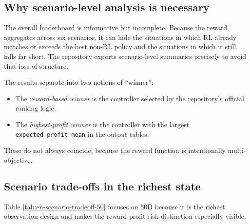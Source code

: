 \documentclass[12pt,a4paper]{article}
\begin{document}
\subsection{Why scenario-level analysis is necessary}

The overall leaderboard is informative but incomplete. Because the reward aggregates across six scenarios, it can hide the situations in which RL already matches or exceeds the best non-RL policy and the situations in which it still falls far short. The repository exports scenario-level summaries precisely to avoid that loss of structure.

The results separate into two notions of ``winner'':
\begin{itemize}[leftmargin=*]
    \item The \emph{reward-based winner} is the controller selected by the repository's official ranking logic.
    \item The \emph{highest-profit winner} is the controller with the largest \texttt{expected\_profit\_mean} in the output tables.
\end{itemize}

These do not always coincide, because the reward function is intentionally multi-objective.

\subsection{Scenario trade-offs in the richest state}

Table \ref{tab:en-scenario-tradeoff-50} focuses on 50D because it is the richest observation design and makes the reward-profit-risk distinction especially visible.
\end{document}
